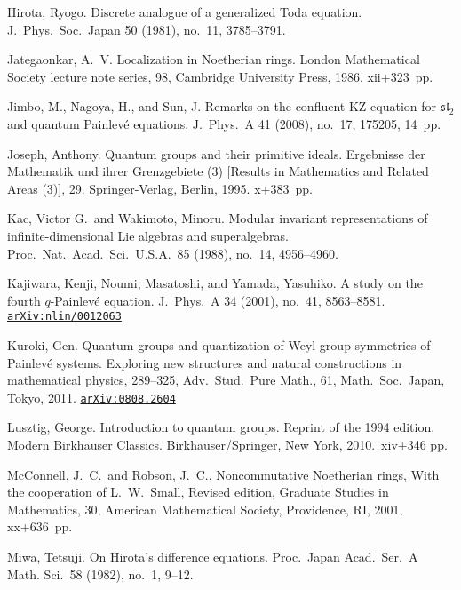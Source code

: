 \documentclass[12pt,twoside]{article}
\newcommand\arxivref[1]{\href{http://arxiv.org/abs/#1}{\tt arXiv:#1}}
\theoremstyle{plain} %
\theoremstyle{definition} %
\theoremstyle{definition} %
\numberwithin{theorem}{section}
\numberwithin{equation}{section}
\numberwithin{figure}{section}
\numberwithin{table}{section}
\begin{document}
\begin{thebibliography}{99}
Hirota, Ryogo.
Discrete analogue of a generalized Toda equation. 
J.\ Phys.\ Soc.\ Japan 50 (1981), no.~11, 3785--3791. 

Jategaonkar, A.~V.
Localization in Noetherian rings.
London Mathematical Society lecture note series, 98, 
Cambridge University Press, 1986, xii+323~pp.

Jimbo, M., Nagoya, H., and  Sun, J. 
Remarks on the confluent KZ equation for $\mathfrak{sl}_2$ 
and quantum Painlev\'e equations. 
J.\ Phys.\ A 41 (2008), no.~17, 175205, 14~pp. 

Joseph, Anthony.
Quantum groups and their primitive ideals.
Ergebnisse der Mathematik und ihrer Grenzgebiete (3) 
[Results in Mathematics and Related Areas (3)], 29. 
Springer-Verlag, Berlin, 1995. x+383~pp. 

Kac, Victor G.\ and Wakimoto, Minoru.
Modular invariant representations of infinite-dimensional Lie algebras and superalgebras.
Proc.\ Nat.\ Acad.\ Sci.\ U.S.A.\ 85 (1988), no.~14, 4956--4960.

Kajiwara, Kenji, Noumi, Masatoshi, and Yamada, Yasuhiko. 
A study on the fourth $q$-Painlev\'e equation. 
J.\ Phys.\ A 34 (2001), no.~41, 8563–8581.
\arxivref{nlin/0012063}

Kuroki, Gen.
Quantum groups and quantization of Weyl group symmetries of Painlev\'e systems. 
Exploring new structures and natural constructions in mathematical physics, 
289--325, Adv.\ Stud.\ Pure Math., 61, Math.\ Soc.\ Japan, Tokyo, 2011.
\arxivref{0808.2604}

Lusztig, George. 
Introduction to quantum groups. 
Reprint of the 1994  edition.  
Modern Birkhauser Classics. 
Birkhauser/Springer, New York, 2010.\ xiv+346 pp. 

McConnell, J.~C.\ and Robson, J.~C., 
Noncommutative Noetherian rings,
With the cooperation of L.~W.~Small, 
Revised edition, 
Graduate Studies in Mathematics, 30, 
American Mathematical Society, Providence, RI, 2001, xx+636~pp.


Miwa, Tetsuji.
On Hirota's difference equations. 
Proc.\ Japan Acad.\ Ser.~A Math. Sci.\ 58 (1982), no.~1, 9--12. 


\end{thebibliography}
\end{document}
